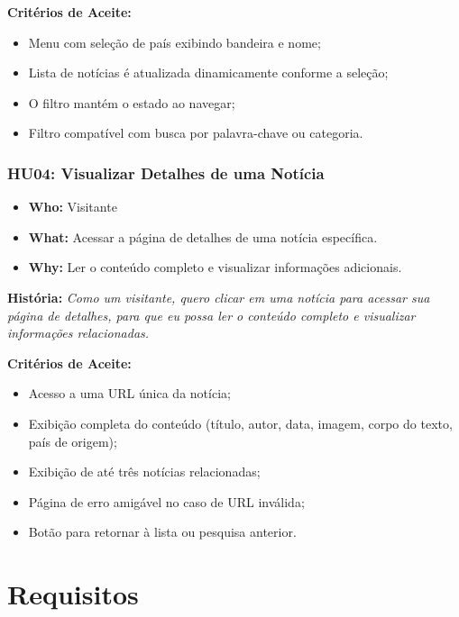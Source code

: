 \noindent \textbf{Critérios de Aceite:}
\begin{itemize}
  \item Menu com seleção de país exibindo bandeira e nome;
  \item Lista de notícias é atualizada dinamicamente conforme a seleção;
  \item O filtro mantém o estado ao navegar;
  \item Filtro compatível com busca por palavra-chave ou categoria.
\end{itemize}

\subsubsection*{HU04: Visualizar Detalhes de uma Notícia}

\begin{itemize}
  \item \textbf{Who:} Visitante
  \item \textbf{What:} Acessar a página de detalhes de uma notícia específica.
  \item \textbf{Why:} Ler o conteúdo completo e visualizar informações adicionais.
\end{itemize}

\noindent \textbf{História:} \textit{Como um visitante, quero clicar em uma notícia para acessar sua página de detalhes, para que eu possa ler o conteúdo completo e visualizar informações relacionadas.}

\noindent \textbf{Critérios de Aceite:}
\begin{itemize}
  \item Acesso a uma URL única da notícia;
  \item Exibição completa do conteúdo (título, autor, data, imagem, corpo do texto, país de origem);
  \item Exibição de até três notícias relacionadas;
  \item Página de erro amigável no caso de URL inválida;
  \item Botão para retornar à lista ou pesquisa anterior.
\end{itemize}









\section{Requisitos}
\label{section:requisitos}

